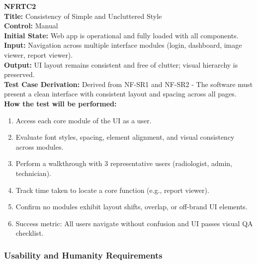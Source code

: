 \documentclass[12pt, titlepage]{article}
\begin{document}
\textbf{NFRTC2}\\
\textbf{Title:} Consistency of Simple and Uncluttered Style\\
\textbf{Control:} Manual\\
\textbf{Initial State:} Web app is operational and fully loaded with all components.\\
\textbf{Input:} Navigation across multiple interface modules (login, dashboard, image viewer, report viewer).\\
\textbf{Output:} UI layout remains consistent and free of clutter; visual hierarchy is preserved.\\
\textbf{Test Case Derivation:} Derived from NF-SR1 and NF-SR2 - The software must present a clean interface with consistent layout and spacing across all pages.\\
\textbf{How the test will be performed:}
\begin{enumerate}
  \item Access each core module of the UI as a user.
  \item Evaluate font styles, spacing, element alignment, and visual consistency across modules.
  \item Perform a walkthrough with 3 representative users (radiologist, admin, technician).
  \item Track time taken to locate a core function (e.g., report viewer).
  \item Confirm no modules exhibit layout shifts, overlap, or off-brand UI elements.
  \item Success metric: All users navigate without confusion and UI passes visual QA checklist.
\end{enumerate}

\vspace{1em}
\subsubsection{Usability and Humanity Requirements}
\end{document}
